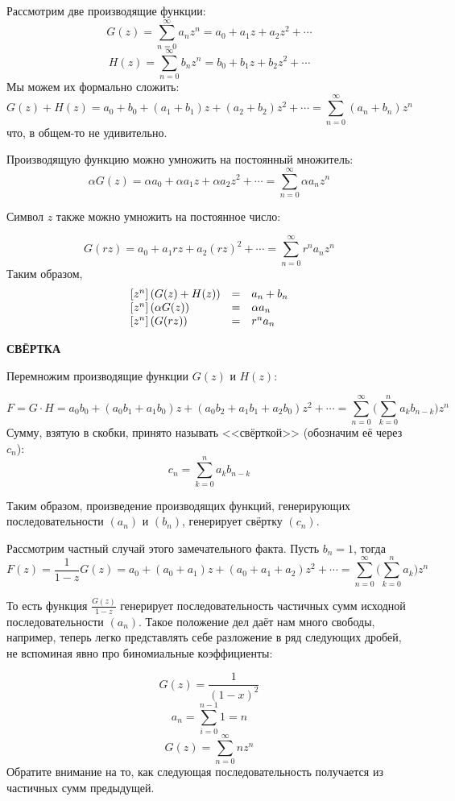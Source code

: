 \documentclass[12pt, letterpaper]{extarticle}
\begin{document}
Рассмотрим две производящие функции:
\[G(z)=\sum_{n=0}^{\infty}a_nz^n=a_0+a_1z+a_2z^2+\dotsb\]
\[H(z)=\sum_{n=0}^{\infty}b_nz^n=b_0+b_1z+b_2z^2+\dotsb\]
Мы можем их формально сложить:
\[G (z) + H(z) = a_0+b_0+(a_1+b_1)z+( a_2+b_2 )z^2+ \cdots = \sum_{n=0}^{\infty}(a_n+b_n)z^n\]
что, в общем-то не удивительно.

Производящую функцию можно умножить на постоянный множитель:
\[\alpha G ( z ) = \alpha a_0+\alpha a_1 z+ \alpha a_2 z^2 + \dotsb = \sum_{n=0}^{\infty}\alpha a_nz^n\]

Символ $z$ также можно умножить на постоянное число:

\[G ( rz ) = a_0+ a_1 rz+ a_2 (rz)^2 + \dotsb = \sum_{n=0}^{\infty}r^n a_n z^n\]
Таким образом,
\[
  \begin{array}{l c l}
    [z^n]\left(G(z)+H(z)\right)&=&a_n+b_n\\{}
    [z^n]\left(\alpha G(z)\right)&=&\alpha a_n\\{}
    [z^n]\left(G(rz)\right)&=&r^na_n
  \end{array}
\]
\begin{center}
  \textbf{СВЁРТКА}
\end{center}

Перемножим производящие функции $G(z)$ и $H(z)$:

\[F = G\cdot H = a_0b_0+(a_0b_1+a_1b_0)z+( a_0b_2 + a_1b_1+a_2b_0)z^2+\dotsb=\sum_{n=0}^{\infty}\Biggl( \sum_{k=0}^n a_kb_{n-k} \Biggr)z^n\]
Сумму, взятую в скобки, принято называть <<свёрткой>> (обозначим её через $c_n$):
\[c_n = \sum_{k=0}^n a_kb_{n-k}\]

Таким образом, произведение производящих функций, генерирующих последовательности $(a_n)$ и $(b_n)$, генерирует свёртку $(c_n)$.

Рассмотрим частный случай этого замечательного факта. Пусть $b_n=1$, тогда
\[F(z) = \frac{1}{1-z}G(z) = a_0 + (a_0+a_1)z + (a_0+a_1+a_2)z^2+\dotsb = \sum_{n=0}^{\infty}\Biggl( \sum_{k=0}^n a_k \Biggr)z^n\]

То есть функция $\frac{G(z)}{1-z}$ генерирует последовательность частичных сумм исходной последовательности $(a_n)$. Такое положение дел даёт нам много свободы, например, теперь легко представлять себе разложение в ряд следующих дробей, не вспоминая явно про биномиальные коэффициенты:

\[G(z) = \frac{1}{(1-x)^2}\]
\[a_n = \sum_{i=0}^{n-1}1=n\]
\[G(z) = \sum_{n=0}^{\infty}nz^n\]
Обратите внимание на то, как следующая последовательность получается из частичных сумм предыдущей.
\end{document}
